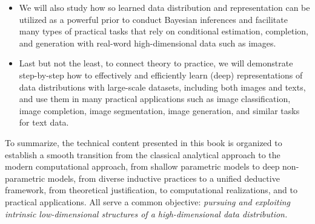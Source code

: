 \documentclass[../../book-main.tex]{subfiles}
\begin{document}
\begin{itemize}
\item We will also study how so learned data distribution and representation can be utilized as a powerful prior to conduct Bayesian inferences and facilitate many types of practical tasks that rely on conditional estimation, completion, and generation with real-word high-dimensional data such as images. 

\item Last but not the least, to connect theory to practice, we will demonstrate step-by-step how to effectively and efficiently learn (deep) representations of  data distributions with large-scale datasets, including both images and texts, and use them in many practical applications such as image classification, image completion, image segmentation, image generation, and similar tasks for text data. 
\end{itemize}

To summarize, the technical content presented in this book is organized to establish a smooth transition from the classical analytical approach to the modern computational approach, from shallow parametric models to deep non-parametric models, from diverse inductive practices to a unified deductive framework, from theoretical justification, to computational realizations, and to practical applications. All serve a common objective: {\em pursuing and exploiting intrinsic low-dimensional structures of a high-dimensional data distribution.} 
\end{document}
